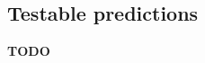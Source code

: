 \documentclass[dwyatte_dissertation.tex]{subfiles}
\begin{document}



\subsection{Testable predictions}
\textbf{TODO}


\newpage


\end{document}
